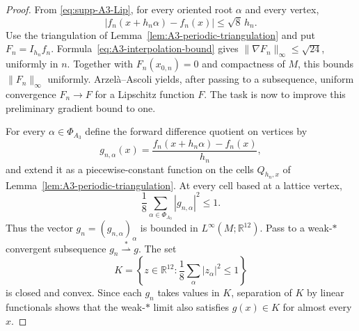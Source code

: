 \documentclass[11pt]{article}
\theoremstyle{definition}
\theoremstyle{remark}
\theoremstyle{definition}
\theoremstyle{remark}
\newcommand{\R}{\mathbb R}
\begin{document}
\begin{proof}
From \eqref{eq:supp-A3-Lip}, for every oriented root $\alpha$ and every vertex,
\begin{equation}
 |f_n(x+h_n\alpha)-f_n(x)|\le\sqrt8\,h_n.
 \label{eq:A3-edge-bound}
\end{equation}
Use the triangulation of Lemma~\ref{lem:A3-periodic-triangulation} and
put $F_n=I_{h_n}f_n$.  Formula~\eqref{eq:A3-interpolation-bound} gives
$\|\nabla F_n\|_\infty\le\sqrt{24}$, uniformly in $n$.
Together with $F_n(x_{0,n})=0$ and compactness of $M$, this bounds
$\|F_n\|_\infty$ uniformly.  Arzel\`a--Ascoli yields, after passing to a
subsequence, uniform convergence $F_n\to F$ for a Lipschitz function $F$.
The task is now to improve this preliminary gradient bound to one.

For every $\alpha\in\Phi_{A_3}$ define the forward difference quotient on vertices
by
\[
 g_{n,\alpha}(x)
 =\frac{f_n(x+h_n\alpha)-f_n(x)}{h_n},
\]
and extend it as a piecewise-constant function on the cells
$Q_{h_n,x}$ of Lemma~\ref{lem:A3-periodic-triangulation}.
At every cell based at a lattice vertex,
\begin{equation}
 \frac18\sum_{\alpha\in\Phi_{A_3}}|g_{n,\alpha}|^2\le1.
 \label{eq:A3-vector-ball}
\end{equation}
Thus the vector $g_n=(g_{n,\alpha})_\alpha$ is bounded in
$L^\infty(M;\R^{12})$.  Pass to a weak-$*$ convergent subsequence
$g_n\stackrel{*}{\rightharpoonup}g$.  The set
\[
 K=\left\{z\in\R^{12}:\frac18\sum_\alpha|z_\alpha|^2\le1\right\}
\]
is closed and convex.  Since each $g_n$ takes values in $K$, separation of $K$ by
linear functionals shows that the weak-$*$ limit also satisfies $g(x)\in K$ for
almost every $x$.


\end{proof}
\end{document}
